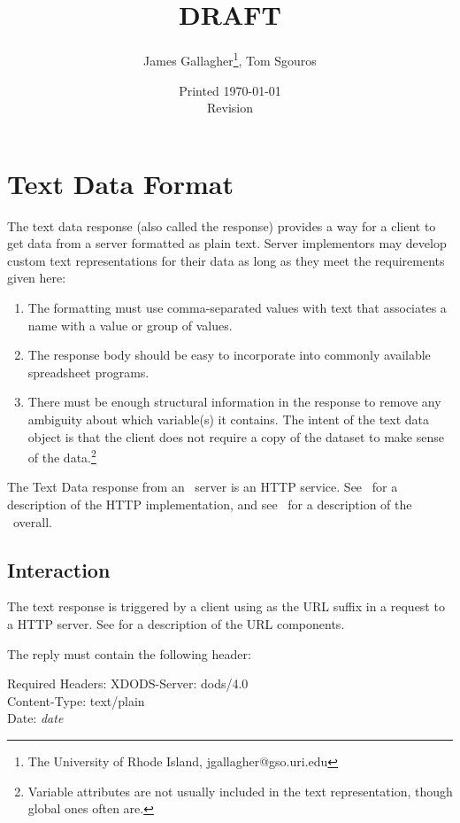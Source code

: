 \documentclass[justify]{dods-paper}
\title{\DAPASCIITitle\\ DRAFT}
\author{James Gallagher\thanks{The University of Rhode Island,
    jgallagher@gso.uri.edu}, Tom Sgouros}
\date{Printed \today \\ Revision \rcsInfoRevision}
\begin{document}
\maketitle
\T\tableofcontents

\section{Text Data Format}
\label{sec-ascii}

The text data response (also called the  response) provides
a way for a client to get data from a \DAP server formatted as plain
text. Server implementors may develop custom text representations for
their data as long as they meet the requirements given here:

\begin{enumerate}
\item The formatting must use comma-separated values with text that
  associates a name with a value or group of values.
\item The response body should be easy to incorporate into commonly
  available spreadsheet programs.
\item There must be enough structural information in the response to
  remove any ambiguity about which variable(s) it contains.  The
  intent of the text data object is that the client does not require a
  copy of the dataset \DDX to make sense of the data.\footnote{Variable
  attributes are not usually included in the text representation,
  though global ones often are.}
\end{enumerate}

The Text Data response from an \opendap\ server is an HTTP
service.  See \DAPHTTP\ for a description of the \DAP HTTP
implementation, and see \DAPObjects\ for a description of the \DAP\
overall.  

\subsection{Interaction}

The text response is triggered by a client using  as the URL
suffix in a request to a  server.  See \DAPHTTP for a
description of the \DAP URL components.

The reply must contain the following header:

\begin{textoutput}{Required Headers:}
XDODS-Server: dods/4.0\\
Content-Type: text/plain\\
Date: \emph{date}
\end{textoutput}
\end{document}
